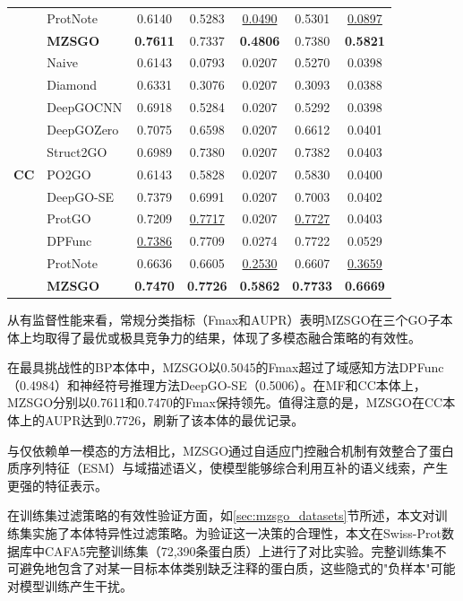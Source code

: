 \begin{table}[htbp]
\begin{tabular}{llccccc}
 & ProtNote & 0.6140 & 0.5283 & \underline{0.0490} & 0.5301 & \underline{0.0897} \\
 & \textbf{MZSGO} & \textbf{0.7611} & 0.7337 & \textbf{0.4806} & 0.7380 & \textbf{0.5821} \\
\midrule
\multirow{11}{*}{\textbf{CC}} 
 & Naive & 0.6143 & 0.0793 & 0.0207 & 0.5270 & 0.0398 \\
 & Diamond & 0.6331 & 0.3076 & 0.0207 & 0.3093 & 0.0388 \\
 & DeepGOCNN & 0.6918 & 0.5284 & 0.0207 & 0.5292 & 0.0398 \\
 & DeepGOZero & 0.7075 & 0.6598 & 0.0207 & 0.6612 & 0.0401 \\
 & Struct2GO & 0.6989 & 0.7380 & 0.0207 & 0.7382 & 0.0403 \\
 & PO2GO & 0.6143 & 0.5828 & 0.0207 & 0.5830 & 0.0400 \\
 & DeepGO-SE & 0.7379 & 0.6991 & 0.0207 & 0.7003 & 0.0402 \\
 & ProtGO & 0.7209 & \underline{0.7717} & 0.0207 & \underline{0.7727} & 0.0403 \\
 & DPFunc & \underline{0.7386} & 0.7709 & 0.0274 & 0.7722 & 0.0529 \\
 & ProtNote & 0.6636 & 0.6605 & \underline{0.2530} & 0.6607 & \underline{0.3659} \\
 & \textbf{MZSGO} & \textbf{0.7470} & \textbf{0.7726} & \textbf{0.5862} & \textbf{0.7733} & \textbf{0.6669} \\
\bottomrule
\end{tabular}
\end{table}

从有监督性能来看，常规分类指标（Fmax和AUPR）表明MZSGO在三个GO子本体上均取得了最优或极具竞争力的结果，体现了多模态融合策略的有效性。

在最具挑战性的BP本体中，MZSGO以0.5045的Fmax超过了域感知方法DPFunc（0.4984）和神经符号推理方法DeepGO-SE（0.5006）。在MF和CC本体上，MZSGO分别以0.7611和0.7470的Fmax保持领先。值得注意的是，MZSGO在CC本体上的AUPR达到0.7726，刷新了该本体的最优记录。

与仅依赖单一模态的方法相比，MZSGO通过自适应门控融合机制有效整合了蛋白质序列特征（ESM）与域描述语义，使模型能够综合利用互补的语义线索，产生更强的特征表示。

在训练集过滤策略的有效性验证方面，如\ref{sec:mzsgo_datasets}节所述，本文对训练集实施了本体特异性过滤策略。为验证这一决策的合理性，本文在Swiss-Prot数据库中CAFA5完整训练集（72,390条蛋白质）上进行了对比实验。完整训练集不可避免地包含了对某一目标本体类别缺乏注释的蛋白质，这些隐式的"负样本"可能对模型训练产生干扰。

